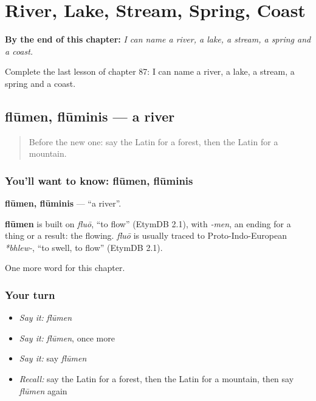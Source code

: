 
\chapter{River, Lake, Stream, Spring, Coast}
\label{ch:la-river-lake-stream-spring-coast}

\begin{chapteropening}
\textbf{By the end of this chapter:} \emph{I can name a river, a lake, a stream, a spring and a coast.}

Complete the last lesson of chapter 87: I can name a river, a lake, a stream, a spring and a coast.
\end{chapteropening}

\section[flūmen, flūminis]{flūmen, flūminis — a river}

\label{lesson:LA-C87-flumen}



\begin{quote}
Before the new one: say the Latin for a forest, then the Latin for a mountain.
\end{quote}

\subsection*{You'll want to know: flūmen, flūminis}
\textbf{flūmen, flūminis} — \textquotedblleft{}a river\textquotedblright{}.

\begin{cousinweb}
\textbf{flūmen} is built on \emph{fluō}, \textquotedblleft{}to flow\textquotedblright{} (EtymDB 2.1), with \emph{-men}, an ending for a thing or a result: the flowing. \emph{fluō} is usually traced to Proto-Indo-European \emph{*bhlew-}, \textquotedblleft{}to swell, to flow\textquotedblright{} (EtymDB 2.1).
\end{cousinweb}

\begin{grammarlens}[title={What you've built}]
One more word for this chapter.
\end{grammarlens}

\subsection*{Your turn}
\begin{itemize}
\raggedright
  \item \emph{Say it:} \emph{flūmen}
  \item \emph{Say it:} \emph{flūmen}, once more
  \item \emph{Say it:} say \emph{flūmen}
  \item \emph{Recall:} say the Latin for a forest, then the Latin for a mountain, then say \emph{flūmen} again
\end{itemize}

